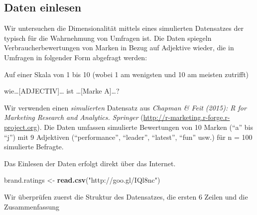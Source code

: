 \documentclass[12pt,]{book}
\makeatletter
\newenvironment{Shaded}{\begin{snugshade}}{\end{snugshade}}
\newcommand{\KeywordTok}[1]{\textcolor[rgb]{0.13,0.29,0.53}{\textbf{{#1}}}}
\newcommand{\StringTok}[1]{\textcolor[rgb]{0.31,0.60,0.02}{{#1}}}
\newcommand{\NormalTok}[1]{{#1}}
\newenvironment{kframe}{%
\medskip{}
\setlength{\fboxsep}{.8em}
 \def\at@end@of@kframe{}%
 \ifinner\ifhmode%
  \def\at@end@of@kframe{\end{minipage}}%
  \begin{minipage}{\columnwidth}%
 \fi\fi%
 \def\FrameCommand##1{\hskip\@totalleftmargin \hskip-\fboxsep
 \colorbox{shadecolor}{##1}\hskip-\fboxsep
     \hskip-\linewidth \hskip-\@totalleftmargin \hskip\columnwidth}%
 \MakeFramed {\advance\hsize-\width
   \@totalleftmargin\z@ \linewidth\hsize
   \@setminipage}}%
 {\par\unskip\endMakeFramed%
 \at@end@of@kframe}
\renewenvironment{Shaded}{\begin{kframe}}{\end{kframe}}
\makeatother
\begin{document}
\subsection{Daten einlesen}\label{daten-einlesen-1}

Wir untersuchen die Dimensionalität mittels eines simulierten
Datensatzes der typisch für die Wahrnehmung von Umfragen ist. Die Daten
spiegeln Verbraucherbewertungen von Marken in Bezug auf Adjektive
wieder, die in Umfragen in folgender Form abgefragt werden:

Auf einer Skala von 1 bis 10 (wobei 1 am wenigsten und 10 am meisten
zutrifft)

wie\ldots{}{[}ADJECTIV{]}\ldots{} ist \ldots{}{[}Marke A{]}\ldots{}?

Wir verwenden einen \emph{simulierten} Datensatz aus \emph{Chapman \&
Feit (2015): R for Marketing Research and Analytics. Springer}
(\url{http://r-marketing.r-forge.r-project.org}). Die Daten umfassen
simulierte Bewertungen von 10 Marken (``a'' bis ``j'') mit 9 Adjektiven
(``performance'', ``leader'', ``latest'', ``fun'' usw.) für n = 100
simulierte Befragte.

Das Einlesen der Daten erfolgt direkt über das Internet.

\begin{Shaded}
\begin{Highlighting}[]
\NormalTok{brand.ratings <-}\StringTok{ }\KeywordTok{read.csv}\NormalTok{(}\StringTok{"http://goo.gl/IQl8nc"}\NormalTok{)}
\end{Highlighting}
\end{Shaded}

Wir überprüfen zuerst die Struktur des Datensatzes, die ersten 6 Zeilen
und die Zusammenfassung
\end{document}

